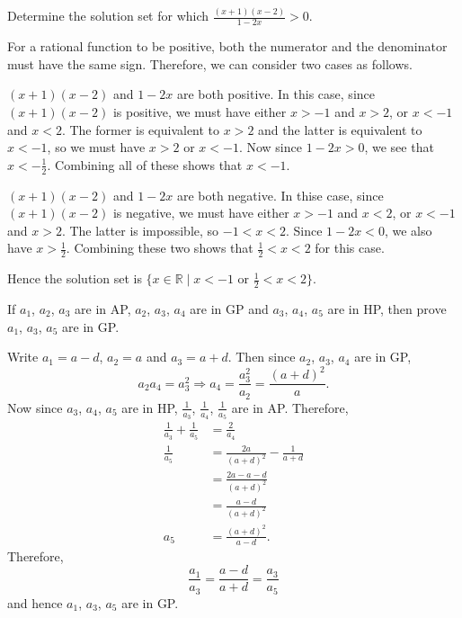 \begin{question}
    Determine the solution set for which $\frac{(x + 1)(x - 2)}{1 - 2x} > 0$.
\end{question}
\begin{solution}
    For a rational function to be positive, both the numerator and the
    denominator must have the same sign. Therefore, we can consider two cases
    as follows.

    \begin{case}{$(x + 1)(x - 2)$ and $1 - 2x$ are both positive.}
    In this case, since $(x + 1)(x - 2)$ is positive, we must have either $x >
    -1$ and $x > 2$, or $x < -1$ and $x < 2$. The former is equivalent to $x >
    2$ and the latter is equivalent to $x < -1$, so we must have $x > 2$ or $x
    < -1$. Now since $1 - 2x > 0$, we see that $x < -\frac{1}{2}$. Combining
    all of these shows that $x < -1$.
    \end{case}

    \begin{case}{$(x + 1)(x - 2)$ and $1 - 2x$ are both negative.}
    In thise case, since $(x + 1)(x - 2)$ is negative, we must have either $x >
    -1$ and $x < 2$, or $x < -1$ and $x > 2$. The latter is impossible, so $-1
    < x < 2$. Since $1 - 2x < 0$, we also have $x > \frac{1}{2}$. Combining
    these two shows that $\frac{1}{2} < x < 2$ for this case.
    \end{case}
    
    Hence the solution set is $\{x \in \mathbb{R} \mid x < -1 \text{ or }
    \frac{1}{2} < x < 2\}$.
\end{solution}

\begin{question}
    If $a_{1}$, $a_{2}$, $a_{3}$ are in AP, $a_{2}$, $a_{3}$, $a_{4}$ are in GP
    and $a_{3}$, $a_{4}$, $a_{5}$ are in HP, then prove $a_{1}$, $a_{3}$,
    $a_{5}$ are in GP.
\end{question}
\begin{solution}
    Write $a_1 = a - d$, $a_2 = a$ and $a_3 = a + d$. Then since $a_2$, $a_3$,
    $a_4$ are in GP, 
    \[a_2a_4 = a_3^2 \Longrightarrow a_4 = \frac{a_3^2}{a_2} = \frac{(a +
    d)^2}{a}.\]
    Now since $a_3$, $a_4$, $a_5$ are in HP, $\frac{1}{a_3}$, $\frac{1}{a_4}$,
    $\frac{1}{a_5}$ are in AP. Therefore, 
    \begin{align*}
        \frac{1}{a_3} + \frac{1}{a_5} &= \frac{2}{a_4}\\
        \frac{1}{a_5} &= \frac{2a}{(a+d)^2} - \frac{1}{a + d}\\
        &= \frac{2a - a - d}{(a + d)^2}\\
        &= \frac{a - d}{(a + d)^2}\\
        a_5 &= \frac{(a + d)^2}{a - d}.
    \end{align*}
    Therefore,
    \[\frac{a_1}{a_3} = \frac{a - d}{a + d} = \frac{a_3}{a_5}\]
    and hence $a_1$, $a_3$, $a_5$ are in GP.
\end{solution}

